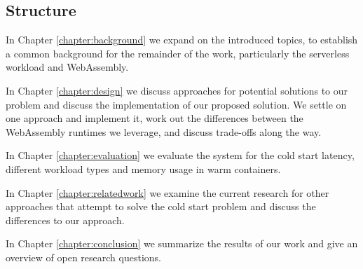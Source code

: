 \subsection{Structure}


In Chapter \ref{chapter:background} we expand on the introduced topics, to establish a common background for the remainder of the work, particularly the serverless workload and WebAssembly.

In Chapter \ref{chapter:design} we discuss approaches for potential solutions to our problem and discuss the implementation of our proposed solution. We settle on one approach and implement it, work out the differences between the WebAssembly runtimes we leverage, and discuss trade-offs along the way.

In Chapter \ref{chapter:evaluation} we evaluate the system for the cold start latency, different workload types and memory usage in warm containers.

In Chapter \ref{chapter:relatedwork} we examine the current research for other approaches that attempt to solve the cold start problem and discuss the differences to our approach. 

In Chapter \ref{chapter:conclusion} we summarize the results of our work and give an overview of open research questions.
